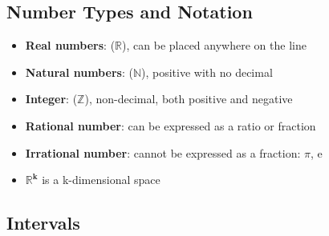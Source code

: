 \subsection{Number Types and Notation}

\begin{center}
\end{center}

\begin{itemize}
    \itemsep-0.5em 
    \item \textbf{Real numbers}: ($\mathbb{R}$), can be placed anywhere on the line
    \item \textbf{Natural numbers}: ($\mathbb{N}$), positive with no decimal
    \item \textbf{Integer}: ($\mathbb{Z}$), non-decimal, both positive and negative
    \item \textbf{Rational number}: can be expressed as a ratio or fraction
    \item \textbf{Irrational number}: cannot be expressed as a fraction: $\pi$, e
    \item $\bm{\mathbb{R}^k}$ is a k-dimensional space
\end{itemize}

\subsection{Intervals}

